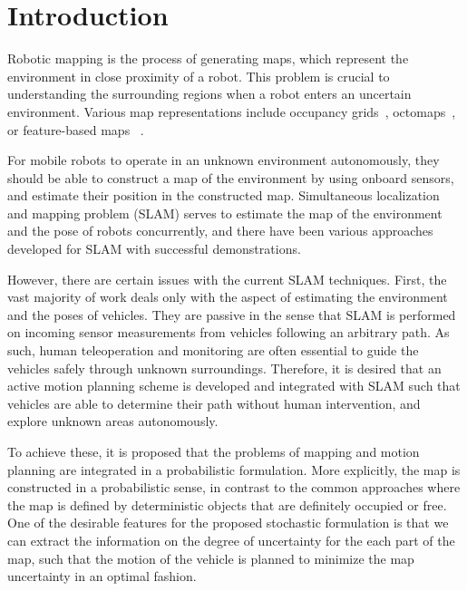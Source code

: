 \documentclass[smallextended]{svjour3}       %
\begin{document}
\section{Introduction}
\label{intro}
Robotic mapping is the process of generating maps, which represent the environment in close proximity of a robot. 
This problem is crucial to understanding the surrounding regions when a robot enters an uncertain environment.
Various map representations include occupancy grids~\cite{WolSuk05}, octomaps~\cite{WurHorBenStaBur10}, or feature-based maps%
~\cite{MonThrKolWeg02}.

For mobile robots to operate in an unknown environment autonomously, they should be able to construct a map of the environment by using onboard sensors, and estimate their position in the constructed map. Simultaneous localization and mapping problem (SLAM) serves to estimate the map of the environment and the pose of robots concurrently, and there have been various approaches developed for SLAM with successful demonstrations.

However, there are certain issues with the current SLAM techniques. First, the vast majority of work deals only with the aspect of estimating the environment and the poses of vehicles. They are passive in the sense that SLAM is performed on incoming sensor measurements from vehicles following an arbitrary path. As such, human teleoperation and monitoring are often essential to guide the vehicles safely through unknown surroundings. Therefore, it is desired that an active motion planning scheme is developed and integrated with SLAM such that vehicles are able to determine their path without human intervention, and explore unknown areas autonomously.

To achieve these, it is proposed that the problems of mapping and motion planning are integrated in a probabilistic formulation. More explicitly, the map is constructed in a probabilistic sense, in contrast to the common approaches where the map is defined by deterministic objects that are definitely occupied or free. One of the desirable features for the proposed stochastic formulation is that we can extract the information on the degree of uncertainty for the each part of the map, such that the motion of the vehicle is planned to minimize the map uncertainty in an optimal fashion. 
\end{document}
